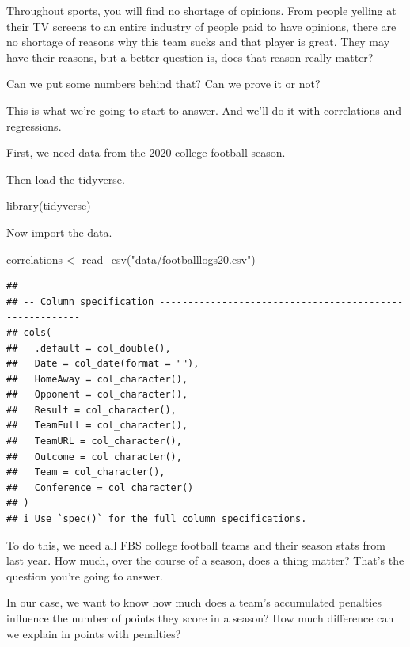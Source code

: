 \documentclass[
]{book}
\newenvironment{Shaded}{\begin{snugshade}}{\end{snugshade}}
\newcommand{\FunctionTok}[1]{\textcolor[rgb]{0.00,0.00,0.00}{#1}}
\newcommand{\NormalTok}[1]{#1}
\newcommand{\OtherTok}[1]{\textcolor[rgb]{0.56,0.35,0.01}{#1}}
\newcommand{\StringTok}[1]{\textcolor[rgb]{0.31,0.60,0.02}{#1}}
\begin{document}
Throughout sports, you will find no shortage of opinions. From people yelling at their TV screens to an entire industry of people paid to have opinions, there are no shortage of reasons why this team sucks and that player is great. They may have their reasons, but a better question is, does that reason really matter?

Can we put some numbers behind that? Can we prove it or not?

This is what we're going to start to answer. And we'll do it with correlations and regressions.

First, we need data from the 2020 college football season.

Then load the tidyverse.

\begin{Shaded}
\begin{Highlighting}[]
\FunctionTok{library}\NormalTok{(tidyverse)}
\end{Highlighting}
\end{Shaded}

Now import the data.

\begin{Shaded}
\begin{Highlighting}[]
\NormalTok{correlations }\OtherTok{\textless{}{-}} \FunctionTok{read\_csv}\NormalTok{(}\StringTok{"data/footballlogs20.csv"}\NormalTok{)}
\end{Highlighting}
\end{Shaded}

\begin{verbatim}
## 
## -- Column specification --------------------------------------------------------
## cols(
##   .default = col_double(),
##   Date = col_date(format = ""),
##   HomeAway = col_character(),
##   Opponent = col_character(),
##   Result = col_character(),
##   TeamFull = col_character(),
##   TeamURL = col_character(),
##   Outcome = col_character(),
##   Team = col_character(),
##   Conference = col_character()
## )
## i Use `spec()` for the full column specifications.
\end{verbatim}

To do this, we need all FBS college football teams and their season stats from last year. How much, over the course of a season, does a thing matter? That's the question you're going to answer.

In our case, we want to know how much does a team's accumulated penalties influence the number of points they score in a season? How much difference can we explain in points with penalties?
\end{document}
